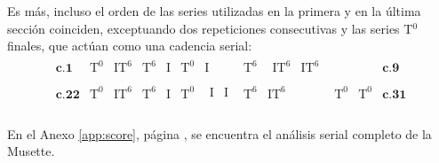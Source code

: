 		Es más, incluso el orden de las series utilizadas en la primera y en la última sección coinciden, exceptuando dos repeticiones consecutivas y las series T$^0$ finales, que actúan como una cadencia serial:
		\[\begin{matrix}\mathbf{c}.\mathbf{1}&\text{T}^0&\text{IT}^6&\text{T}^6&\text{I}&\text{T}^0&\text{I}&\text{T}^6&\begin{matrix}\text{IT}^6&\text{IT}^6\\\end{matrix}&&&\mathbf{c}.\mathbf{9}\\\mathbf{c}.\mathbf{22}&\text{T}^0&\text{IT}^6&\text{T}^6&\text{I}&\text{T}^0&\begin{matrix}\text{I}&\text{I}\\\end{matrix}&\text{T}^6&\text{IT}^6&\text{T}^0&\text{T}^0&\mathbf{c}.\mathbf{31}\\\end{matrix}\]
		
		En el Anexo \ref{app:score}, página \pageref{app:score}, se encuentra el análisis serial completo de la Musette.